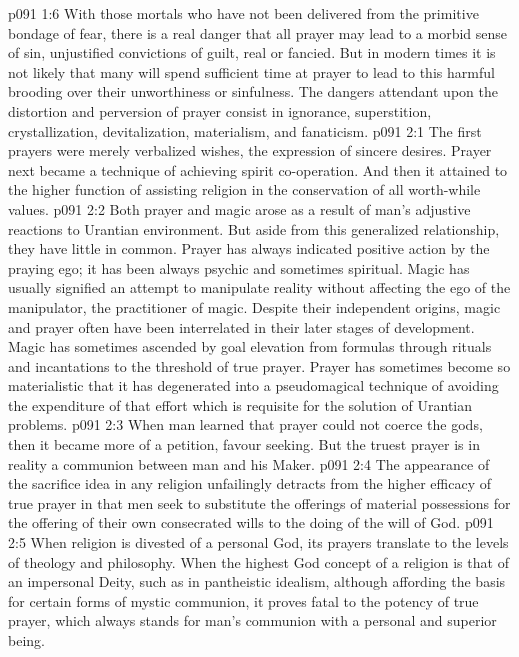 \vs p091 1:6 \pc With those mortals who have not been delivered from the primitive bondage of fear, there is a real danger that all prayer may lead to a morbid sense of sin, unjustified convictions of guilt, real or fancied. But in modern times it is not likely that many will spend sufficient time at prayer to lead to this harmful brooding over their unworthiness or sinfulness. The dangers attendant upon the distortion and perversion of prayer consist in ignorance, superstition, crystallization, devitalization, materialism, and fanaticism.
\vs p091 2:1 The first prayers were merely verbalized wishes, the expression of sincere desires. Prayer next became a technique of achieving spirit co\hyp{}operation. And then it attained to the higher function of assisting religion in the conservation of all worth\hyp{}while values.
\vs p091 2:2 Both prayer and magic arose as a result of man’s adjustive reactions to Urantian environment. But aside from this generalized relationship, they have little in common. Prayer has always indicated positive action by the praying ego; it has been always psychic and sometimes spiritual. Magic has usually signified an attempt to manipulate reality without affecting the ego of the manipulator, the practitioner of magic. Despite their independent origins, magic and prayer often have been interrelated in their later stages of development. Magic has sometimes ascended by goal elevation from formulas through rituals and incantations to the threshold of true prayer. Prayer has sometimes become so materialistic that it has degenerated into a pseudomagical technique of avoiding the expenditure of that effort which is requisite for the solution of Urantian problems.
\vs p091 2:3 \pc When man learned that prayer could not coerce the gods, then it became more of a petition, favour seeking. But the truest prayer is in reality a communion between man and his Maker.
\vs p091 2:4 \pc The appearance of the sacrifice idea in any religion unfailingly detracts from the higher efficacy of true prayer in that men seek to substitute the offerings of material possessions for the offering of their own consecrated wills to the doing of the will of God.
\vs p091 2:5 When religion is divested of a personal God, its prayers translate to the levels of theology and philosophy. When the highest God concept of a religion is that of an impersonal Deity, such as in pantheistic idealism, although affording the basis for certain forms of mystic communion, it proves fatal to the potency of true prayer, which always stands for man’s communion with a personal and superior being.
